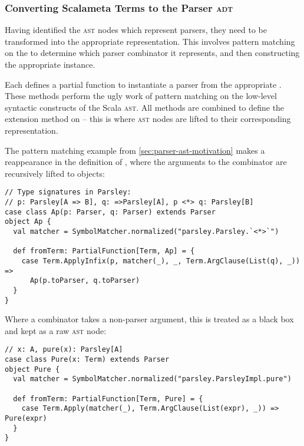 \documentclass[../../main.tex]{subfiles}
\begin{document}

\subsubsection{Converting Scalameta Terms to the Parser \textsc{adt}}
Having identified the \textsc{ast} nodes which represent parsers, they need to be transformed into the appropriate  representation.
This involves pattern matching on the  to determine which parser combinator it represents, and then constructing the appropriate  instance.

Each  defines a partial function  to instantiate a parser from the appropriate .
These  methods perform the ugly work of pattern matching on the low-level syntactic constructs of the Scala \textsc{ast}.
All  methods are combined to define the  extension method on  -- this is where \textsc{ast} nodes are lifted to their corresponding  representation.

The pattern matching example from \cref{sec:parser-ast-motivation} makes a reappearance in the definition of , where the arguments to the \scala{<*>} combinator are recursively lifted to  objects:
\begin{verbatim}
// Type signatures in Parsley:
// p: Parsley[A => B], q: =>Parsley[A], p <*> q: Parsley[B]
case class Ap(p: Parser, q: Parser) extends Parser
object Ap {
  val matcher = SymbolMatcher.normalized("parsley.Parsley.`<*>`")

  def fromTerm: PartialFunction[Term, Ap] = {
    case Term.ApplyInfix(p, matcher(_), _, Term.ArgClause(List(q), _)) =>
      Ap(p.toParser, q.toParser)
  }
}
\end{verbatim}
%
Where a combinator takes a non-parser argument, this is treated as a black box and kept as a raw \textsc{ast} node:
\begin{verbatim}
// x: A, pure(x): Parsley[A]
case class Pure(x: Term) extends Parser
object Pure {
  val matcher = SymbolMatcher.normalized("parsley.ParsleyImpl.pure")

  def fromTerm: PartialFunction[Term, Pure] = {
    case Term.Apply(matcher(_), Term.ArgClause(List(expr), _)) => Pure(expr)
  }
}
\end{verbatim}
\end{document}

